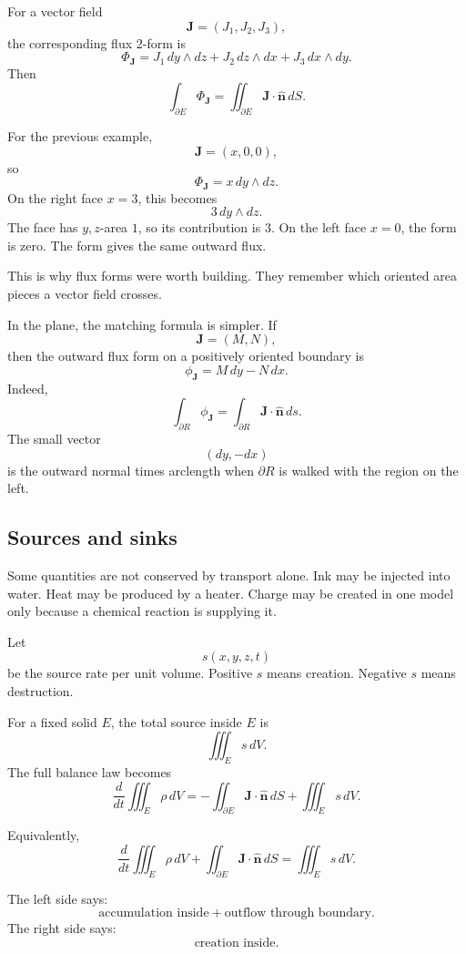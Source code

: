For a vector field
\[
    \mathbf J=(J_1,J_2,J_3),
\]
the corresponding flux \(2\)-form is
\[
\boxed{
    \Phi_{\mathbf J}
    =
    J_1\,dy\wedge dz
    +
    J_2\,dz\wedge dx
    +
    J_3\,dx\wedge dy.
}
\]
Then
\[
\boxed{
    \int_{\partial E}\Phi_{\mathbf J}
    =
    \iint_{\partial E}\mathbf J\cdot\widehat{\mathbf n}\,dS.
}
\]

For the previous example,
\[
    \mathbf J=(x,0,0),
\]
so
\[
    \Phi_{\mathbf J}=x\,dy\wedge dz.
\]
On the right face \(x=3\), this becomes
\[
    3\,dy\wedge dz.
\]
The face has \(y,z\)-area \(1\), so its contribution is \(3\).  On the left face \(x=0\),
the form is zero.  The form gives the same outward flux.

This is why flux forms were worth building.  They remember which oriented area pieces
a vector field crosses.

In the plane, the matching formula is simpler.  If
\[
    \mathbf J=(M,N),
\]
then the outward flux form on a positively oriented boundary is
\[
\boxed{
    \phi_{\mathbf J}=M\,dy-N\,dx.
}
\]
Indeed,
\[
    \int_{\partial R}\phi_{\mathbf J}
    =
    \int_{\partial R}\mathbf J\cdot\widehat{\mathbf n}\,ds.
\]
The small vector
\[
    (dy,-dx)
\]
is the outward normal times arclength when \(\partial R\) is walked with the region on
the left.

\subsection{Sources and sinks}

Some quantities are not conserved by transport alone.  Ink may be injected into water.
Heat may be produced by a heater.  Charge may be created in one model only because a
chemical reaction is supplying it.

Let
\[
    s(x,y,z,t)
\]
be the source rate per unit volume.  Positive \(s\) means creation.  Negative \(s\) means
destruction.

For a fixed solid \(E\), the total source inside \(E\) is
\[
    \iiint_E s\,dV.
\]
The full balance law becomes
\[
\boxed{
    \frac{d}{dt}\iiint_E \rho\,dV
    =
    -\iint_{\partial E}\mathbf J\cdot\widehat{\mathbf n}\,dS
    +
    \iiint_E s\,dV.
}
\]

Equivalently,
\[
\boxed{
    \frac{d}{dt}\iiint_E \rho\,dV
    +
    \iint_{\partial E}\mathbf J\cdot\widehat{\mathbf n}\,dS
    =
    \iiint_E s\,dV.
}
\]

The left side says:
\[
    \text{accumulation inside}+\text{outflow through boundary}.
\]
The right side says:
\[
    \text{creation inside}.
\]

